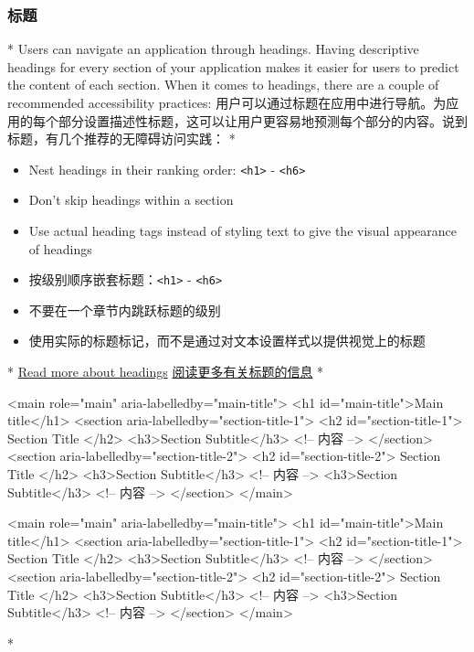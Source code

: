 \begin{paracol}{2}
\subsubsection{标题}
\switchcolumn[0]*%
Users can navigate an application through headings. Having descriptive
headings for every section of your application makes it easier for users
to predict the content of each section. When it comes to headings, there
are a couple of recommended accessibility practices:
\switchcolumn
用户可以通过标题在应用中进行导航。为应用的每个部分设置描述性标题，这可以让用户更容易地预测每个部分的内容。说到标题，有几个推荐的无障碍访问实践：
\switchcolumn[0]*%
\begin{itemize}
\item
  Nest headings in their ranking order:
  \texttt{\textless{}h1\textgreater{}} -
  \texttt{\textless{}h6\textgreater{}}
\item
  Don't skip headings within a section
\item
  Use actual heading tags instead of styling text to give the visual
  appearance of headings
\end{itemize}
\switchcolumn
\begin{itemize}
\item
  按级别顺序嵌套标题：\texttt{\textless{}h1\textgreater{}} -
  \texttt{\textless{}h6\textgreater{}}
\item
  不要在一个章节内跳跃标题的级别
\item
  使用实际的标题标记，而不是通过对文本设置样式以提供视觉上的标题
\end{itemize}
\switchcolumn[0]*%
\href{https://www.w3.org/TR/UNDERSTANDING-WCAG20/navigation-mechanisms-descriptive.html}{Read
more about headings}
\switchcolumn
\href{https://www.w3.org/TR/UNDERSTANDING-WCAG20/navigation-mechanisms-descriptive.html}{阅读更多有关标题的信息}
\switchcolumn[0]*%
\begin{codeHtml}
<main role="main" aria-labelledby="main-title">
  <h1 id="main-title">Main title</h1>
  <section aria-labelledby="section-title-1">
    <h2 id="section-title-1"> Section Title </h2>
    <h3>Section Subtitle</h3>
    <!-- 内容 -->
  </section>
  <section aria-labelledby="section-title-2">
    <h2 id="section-title-2"> Section Title </h2>
    <h3>Section Subtitle</h3>
    <!-- 内容 -->
    <h3>Section Subtitle</h3>
    <!-- 内容 -->
  </section>
</main>
\end{codeHtml}
\switchcolumn
\begin{codeHtml}
<main role="main" aria-labelledby="main-title">
  <h1 id="main-title">Main title</h1>
  <section aria-labelledby="section-title-1">
    <h2 id="section-title-1"> Section Title </h2>
    <h3>Section Subtitle</h3>
    <!-- 内容 -->
  </section>
  <section aria-labelledby="section-title-2">
    <h2 id="section-title-2"> Section Title </h2>
    <h3>Section Subtitle</h3>
    <!-- 内容 -->
    <h3>Section Subtitle</h3>
    <!-- 内容 -->
  </section>
</main>
\end{codeHtml}
\switchcolumn[0]*%

\end{paracol}
